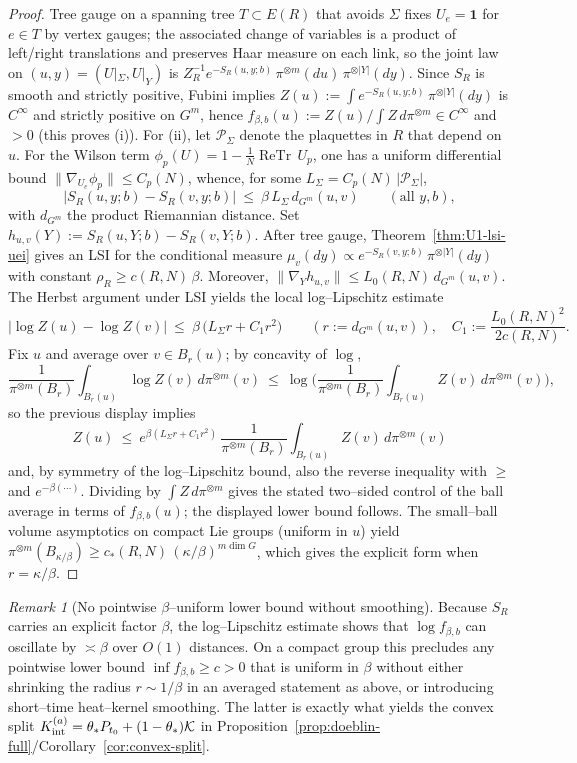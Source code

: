 \documentclass[11pt]{amsart}
\theoremstyle{plain}
\theoremstyle{definition}
\theoremstyle{remark}
\newtheorem{remark}[theorem]{Remark}
\renewcommand{\tfrac}[2]{\textstyle\frac{#1}{#2}}
\begin{document}
\begin{proof}
Tree gauge on a spanning tree $T\subset E(R)$ that avoids $\Sigma$ fixes $U_e=\mathbf 1$ for $e\in T$ by vertex gauges; the associated change of variables is a product of left/right translations and preserves Haar measure on each link, so the joint law on $(u,y)=(U|_{\Sigma},U|_Y)$ is $Z_R^{-1}e^{-S_R(u,y;b)}\,\pi^{\otimes m}(du)\,\pi^{\otimes |Y|}(dy)$. Since $S_R$ is smooth and strictly positive, Fubini implies $Z(u):=\int e^{-S_R(u,y;b)}\,\pi^{\otimes |Y|}(dy)$ is $C^\infty$ and strictly positive on $G^m$, hence $f_{\beta,b}(u):=Z(u)/\int Z\,d\pi^{\otimes m}\in C^\infty$ and $>0$ (this proves (i)).
For (ii), let $\mathcal P_\Sigma$ denote the plaquettes in $R$ that depend on $u$. For the Wilson term $\phi_p(U)=1-\tfrac1N\operatorname{ReTr}\,U_p$, one has a uniform differential bound $\|\nabla_{U_e}\phi_p\|\le C_p(N)$, whence, for some $L_\Sigma=C_p(N)\,|\mathcal P_\Sigma|$,
\[
  |S_R(u,y;b)-S_R(v,y;b)|\ \le\ \beta\,L_\Sigma\, d_{G^m}(u,v)\qquad(\text{all }y,b),
\]
with $d_{G^m}$ the product Riemannian distance. Set $h_{u,v}(Y):=S_R(u,Y;b)-S_R(v,Y;b)$. After tree gauge, Theorem~\ref{thm:U1-lsi-uei} gives an LSI for the conditional measure $\mu_v(dy)\propto e^{-S_R(v,y;b)}\,\pi^{\otimes |Y|}(dy)$ with constant $\rho_R\ge c(R,N)\,\beta$. Moreover, $\|\nabla_Y h_{u,v}\|\le L_0(R,N)\, d_{G^m}(u,v)$. The Herbst argument under LSI yields the local log--Lipschitz estimate
\[
  \big|\log Z(u)-\log Z(v)\big|\ \le\ \beta\,\big(L_\Sigma r + C_1 r^2\big)\qquad(r:=d_{G^m}(u,v)),\quad C_1:=\tfrac{L_0(R,N)^2}{2c(R,N)}.
\]
Fix $u$ and average over $v\in B_r(u)$; by concavity of $\log$,
\[
  \frac{1}{\pi^{\otimes m}(B_r)}\int_{B_r(u)}\! \log Z(v)\,d\pi^{\otimes m}(v)\ \le\ \log\Big(\frac{1}{\pi^{\otimes m}(B_r)}\int_{B_r(u)}\! Z(v)\,d\pi^{\otimes m}(v)\Big),
\]
so the previous display implies
\[
  Z(u)\ \le\ e^{\beta(L_\Sigma r + C_1 r^2)}\,\frac{1}{\pi^{\otimes m}(B_r)}\int_{B_r(u)} Z(v)\,d\pi^{\otimes m}(v)
\]
and, by symmetry of the log--Lipschitz bound, also the reverse inequality with $\ge$ and $e^{-\beta(\cdots)}$. Dividing by $\int Z\,d\pi^{\otimes m}$ gives the stated two--sided control of the ball average in terms of $f_{\beta,b}(u)$; the displayed lower bound follows. The small--ball volume asymptotics on compact Lie groups (uniform in $u$) yield $\pi^{\otimes m}(B_{\kappa/\beta})\ge c_*(R,N)\, (\kappa/\beta)^{m\dim G}$, which gives the explicit form when $r=\kappa/\beta$.
\end{proof}

\begin{remark}[No pointwise $\beta$--uniform lower bound without smoothing]\label{rem:no-pointwise-lower}
Because $S_R$ carries an explicit factor $\beta$, the log--Lipschitz estimate shows that $\log f_{\beta,b}$ can oscillate by $\asymp \beta$ over $O(1)$ distances. On a compact group this precludes any pointwise lower bound $\inf f_{\beta,b}\ge c>0$ that is uniform in $\beta$ without either shrinking the radius $r\sim 1/\beta$ in an averaged statement as above, or introducing short--time heat--kernel smoothing. The latter is exactly what yields the convex split $K_{\rm int}^{(a)}=\theta_* P_{t_0}+(1-\theta_*)\mathcal K$ in Proposition~\ref{prop:doeblin-full}/Corollary~\ref{cor:convex-split}.
\end{remark}
\end{document}
